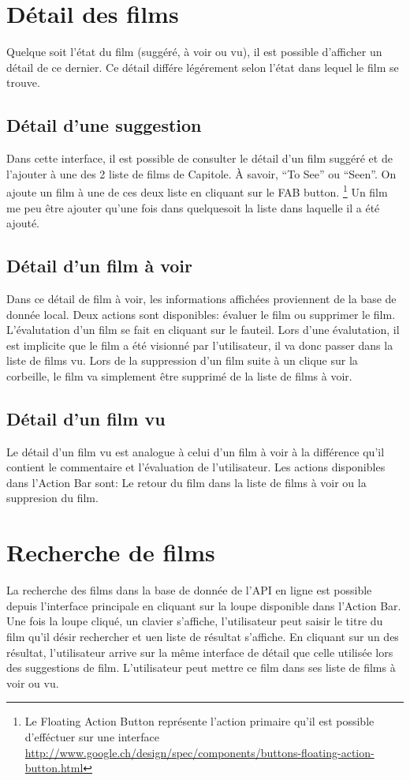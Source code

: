 \section{Détail des films}
Quelque soit l'état du film (suggéré, à voir ou vu), il est possible d'afficher un détail de ce dernier. Ce détail différe légérement selon l'état dans lequel le film se trouve.

\subsection*{Détail d'une suggestion}
Dans cette interface, il est possible de consulter le détail d'un film suggéré et de l'ajouter à une des 2 liste de films de Capitole. À savoir, ``To See'' ou ``Seen''. On ajoute un film à une de ces deux liste en cliquant sur le FAB button. \footnote{Le Floating Action Button représente l'action primaire qu'il est possible d'efféctuer sur une interface \url{http://www.google.ch/design/spec/components/buttons-floating-action-button.html}} Un film me peu être ajouter qu'une fois dans quelquesoit la liste dans laquelle il a été ajouté.

\subsection*{Détail d'un film à voir}
Dans ce détail de film à voir, les informations affichées proviennent de la base de donnée local. Deux actions sont disponibles: évaluer le film ou supprimer le film. L'évalutation d'un film se fait en cliquant sur le fauteil. Lors d'une évalutation, il est implicite que le film a été visionné par l'utilisateur, il va donc passer dans la liste de films vu. Lors de la suppression d'un film suite à un clique sur la corbeille, le film va simplement être supprimé de la liste de films à voir.

\subsection*{Détail d'un film vu}
Le détail d'un film vu est analogue à celui d'un film à voir à la différence qu'il contient le commentaire et l'évaluation de l'utilisateur. Les actions disponibles dans l'Action Bar sont: Le retour du film dans la liste de films à voir ou la suppresion du film.

\section{Recherche de films}
La recherche des films dans la base de donnée de l'API en ligne est possible depuis l'interface principale en cliquant sur la loupe disponible dans l'Action Bar. Une fois la loupe cliqué, un clavier s'affiche, l'utilisateur peut saisir le titre du film qu'il désir rechercher et uen liste de résultat s'affiche. En cliquant sur un des résultat, l'utilisateur arrive sur la même interface de détail que celle utilisée lors des suggestions de film. L'utilisateur peut mettre ce film dans ses liste de films à voir ou vu.

